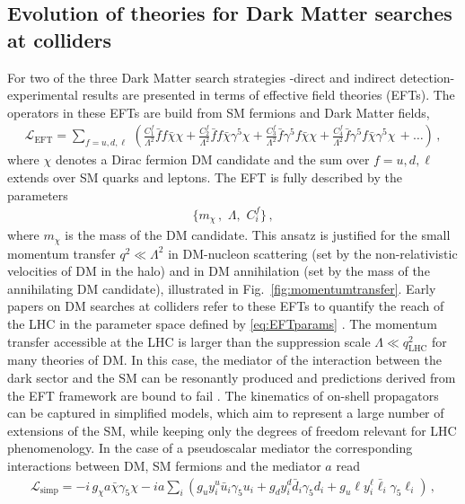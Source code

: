 \subsection{Evolution of theories for Dark Matter searches at colliders} For two of the three Dark Matter search strategies 
-direct and indirect detection- experimental results are presented in terms of effective field theories (EFTs). The operators in these EFTs are build from SM fermions and Dark Matter fields, 
\begin{align}\label{eq:EFT}
\mathcal{L}_\text{EFT}= \sum_{f=u, d, \ell} \,\left(\frac{C_{1}^f}{\Lambda^2} \bar f f \bar \chi \chi+ \frac{C^f_{2}}{\Lambda^2}\bar  f f \bar \chi \gamma^5\chi +\frac{C_{3}^f }{\Lambda^2}\bar  f \gamma^5 f \bar \chi \chi +\frac{C_{4}^f}{\Lambda^2} \bar  f \gamma^5 f \bar \chi\gamma^5 \chi \,+\ldots \right) \,,
\end{align}
where $\chi$ denotes a Dirac fermion DM candidate and the sum over $f=u,d,\ell$ extends over SM quarks and leptons. 
The EFT is fully described by the parameters 
\begin{align}\label{eq:EFTparams}
\big\{ m_\chi\,,\,\,\Lambda ,\,\, C_i^f\big\} \,,
\end{align}
where $m_\chi$ is the mass of the DM candidate.
This ansatz is justified for the small momentum transfer $q^2\ll \Lambda^2$ in DM-nucleon scattering (set by the non-relativistic velocities of DM in the halo) and in DM annihilation (set by the mass of the annihilating DM candidate), illustrated in Fig.~\ref{fig:momentumtransfer}. Early papers on DM searches at colliders refer to these EFTs to quantify 
the reach of the LHC in the parameter space defined by \eqref{eq:EFTparams}  \cite{Beltran:2010ww, Fox:2011pm,Goodman:2010ku}. The momentum transfer accessible at the LHC is larger than the suppression scale 
$\Lambda \ll q^2_\text{LHC}$ for many theories of DM. 
In this case, the mediator of the interaction between the dark sector and the SM can be resonantly produced and 
predictions derived from the EFT framework are bound to fail \cite{}. The kinematics   
of on-shell propagators can be captured in simplified models, which aim to represent a large number of extensions 
of the SM, while keeping only the degrees of freedom relevant for LHC phenomenology. In the case of a pseudoscalar mediator the corresponding interactions between DM, SM fermions and the mediator $a$ read
\begin{align}\label{eq:simp}
\mathcal{L}_\text{simp}=-i\,g_\chi a\bar \chi \gamma_5 \chi -i a \sum_i \left(g_u y_i^u \bar u_i \gamma_5 u_i + g_d y_i^d \bar d_i \gamma_5 d_i + g_u\ell y_i^\ell \bar \ell_i \gamma_5 \ell_i  \right) \,,
\end{align}
